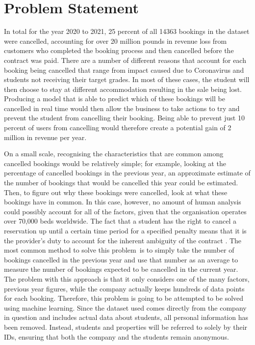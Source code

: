 \section{Problem Statement}

In total for the year 2020 to 2021, 25 percent of all 14363 bookings in the dataset were cancelled, accounting for over 20 million pounds in revenue loss from customers who completed the booking process and then cancelled before the contract was paid. There are a number of different reasons that account for each booking being cancelled that range from impact caused due to Coronavirus and students not receiving their target grades. In most of these cases, the student will then choose to stay at different accommodation resulting in the sale being lost. Producing a model that is able to predict which of these bookings will be cancelled in real time would then allow the business to take actions to try and prevent the student from cancelling their booking. Being able to prevent just 10 percent of users from cancelling would therefore create a potential gain of 2 million in revenue per year.  

\vspace{5mm}

On a small scale, recognising the characteristics that are common among cancelled bookings would be relatively simple; for example, looking at the percentage of cancelled bookings in the previous year, an approximate estimate of the number of bookings that would be cancelled this year could be estimated. Then, to figure out why these bookings were cancelled, look at what these bookings have in common. In this case, however, no amount of human analysis could possibly account for all of the factors, given that the organisation operates over 70,000 beds worldwide. The fact that a student has the right to cancel a reservation up until a certain time period for a specified penalty means that it is the provider's duty to account for the inherent ambiguity of the contract . The most common method to solve this problem is to simply take the number of bookings cancelled in the previous year and use that number as an average to measure the number of bookings expected to be cancelled in the current year. The problem with this approach is that it only considers one of the many factors, previous year figures, while the company actually keeps hundreds of data points for each booking. Therefore, this problem is going to be attempted to be solved using  machine learning. Since the dataset used comes directly from the company in question and includes actual data about students, all personal information has been removed. Instead, students and properties will be referred to solely by their IDs, ensuring that both the company and the students remain anonymous.
    
